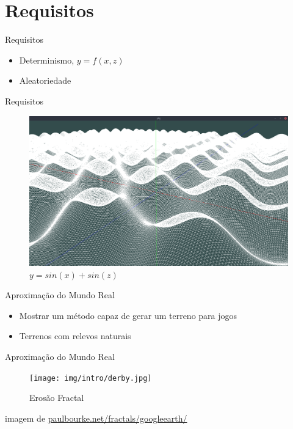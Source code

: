 \section{Requisitos}

\begin{frame}{Requisitos}
    \begin{itemize}
        \item Determinismo, $ y = f(x, z) $
        \item \alert{Aleatoriedade}
    \end{itemize}
\end{frame}

\begin{frame}{Requisitos}
    \begin{figure}
		\centering
        \includegraphics[width=.8\textwidth]{img/intro/sssins.png}
        \caption{$ y = sin(x) + sin(z) $}
    \end{figure}  
\end{frame}



\begin{frame}{Aproximação do Mundo Real}
    \begin{itemize}
        \item Mostrar um método capaz de gerar um terreno para jogos
        \item Terrenos com relevos \alert{naturais}
    \end{itemize}
\end{frame}

\begin{frame}{Aproximação do Mundo Real}
    \begin{figure}
		\centering
        \texttt{[image: img/intro/derby.jpg]}
        \caption{Erosão Fractal}
    \end{figure}
    imagem de \url{paulbourke.net/fractals/googleearth/}
\end{frame}
